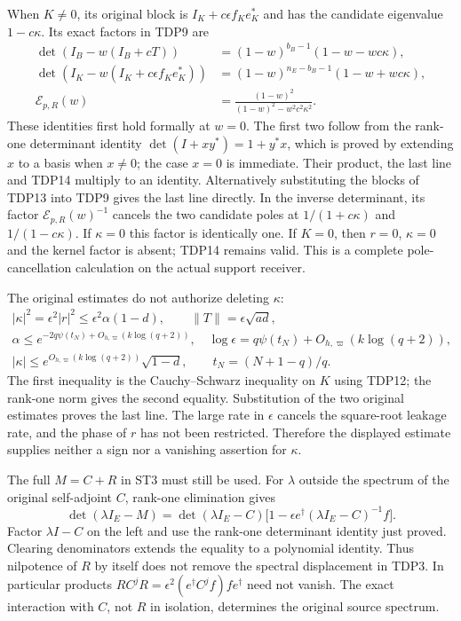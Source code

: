 \documentclass[11pt]{article}
\begin{document}
When $K\ne0$, its original block is $I_K+c\epsilon f_Ke_K^*$ and has
the candidate eigenvalue $1-c\kappa$. Its exact factors in TDP9 are
\begin{equation}\tag{TDP15}
\begin{aligned}
\det(I_B-w(I_B+cT))
 &=(1-w)^{b_B-1}(1-w-wc\kappa),\\
\det(I_K-w(I_K+c\epsilon f_Ke_K^*))
 &=(1-w)^{n_E-b_B-1}(1-w+wc\kappa),\\
\mathcal E_{p,R}(w)
 &=\frac{(1-w)^2}{(1-w)^2-w^2c^2\kappa^2}.
\end{aligned}
\end{equation}
These identities first hold formally at $w=0$. The first two follow
from the rank-one determinant identity
$\det(I+xy^*)=1+y^*x$, which is proved by extending $x$ to a basis when
$x\ne0$; the case $x=0$ is immediate. Their product, the last line and
TDP14 multiply to an identity. Alternatively substituting the blocks
of TDP13 into TDP9 gives the last line directly. In the inverse
determinant, its factor $\mathcal E_{p,R}(w)^{-1}$ cancels the two
candidate poles at $1/(1+c\kappa)$ and $1/(1-c\kappa)$. If $\kappa=0$
this factor is identically one. If $K=0$, then $r=0$, $\kappa=0$ and the
kernel factor is absent; TDP14 remains valid. This is a complete
pole-cancellation calculation on the actual support receiver.

The original estimates do not authorize deleting $\kappa$:
\begin{equation}\tag{TDP16}
\begin{gathered}
|\kappa|^2=\epsilon^2|r|^2
 \le\epsilon^2\alpha(1-d),\qquad
\|T\|=\epsilon\sqrt{ad},\\
\alpha\le e^{-2q\psi(t_N)+O_{h,\varpi}(k\log(q+2))},\quad
\log\epsilon=q\psi(t_N)+O_{h,\varpi}(k\log(q+2)),\\
|\kappa|\le e^{O_{h,\varpi}(k\log(q+2))}\sqrt{1-d},
\qquad t_N=(N+1-q)/q.
\end{gathered}
\end{equation}
The first inequality is the Cauchy--Schwarz inequality on $K$ using
TDP12; the rank-one norm gives the second equality. Substitution of the
two original estimates proves the last line. The large rate in
$\epsilon$ cancels the square-root leakage rate, and the phase of $r$
has not been restricted. Therefore the displayed estimate supplies
neither a sign nor a vanishing assertion for $\kappa$.

The full $M=C+R$ in ST3 must still be used. For $\lambda$ outside the
spectrum of the original self-adjoint $C$, rank-one elimination gives
\begin{equation}\tag{TDP17}
\det(\lambda I_E-M)=\det(\lambda I_E-C)
 \bigl[1-\epsilon e^\dagger(\lambda I_E-C)^{-1}f\bigr].
\end{equation}
Factor $\lambda I-C$ on the left and use the rank-one determinant
identity just proved. Clearing denominators extends the equality to a
polynomial identity. Thus nilpotence of $R$ by itself does not remove
the spectral displacement in TDP3. In particular products
$RC^jR=\epsilon^2(e^\dagger C^jf)fe^\dagger$ need not vanish.
The exact interaction with $C$, not $R$ in isolation, determines the
original source spectrum.
\end{document}
